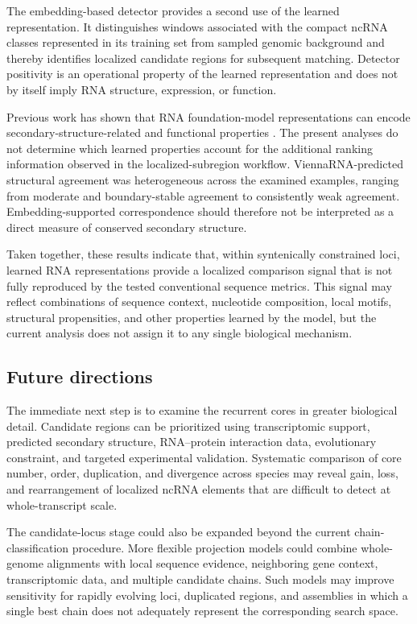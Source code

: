 The embedding-based detector provides a second use of the learned
representation. It distinguishes windows associated with the compact ncRNA
classes represented in its training set from sampled genomic background and
thereby identifies localized candidate regions for subsequent matching.
Detector positivity is an operational property of the learned representation and
does not by itself imply RNA structure, expression, or function.

Previous work has shown that RNA foundation-model representations can encode
secondary-structure-related and functional properties
\citep{chenInterpretableRNAFoundation2022,
    akiyamaInformativeRNABase2022,
    vahabAdvancingNoncodingRNA2025,
    shenAccurateRNA3D2024}.
The present analyses do not determine which learned properties account for the
additional ranking information observed in the localized-subregion workflow.
ViennaRNA-predicted structural agreement was heterogeneous across the examined
examples, ranging from moderate and boundary-stable agreement to consistently
weak agreement. Embedding-supported correspondence should therefore not be
interpreted as a direct measure of conserved secondary structure.

Taken together, these results indicate that, within syntenically constrained
loci, learned RNA representations provide a localized comparison signal that is
not fully reproduced by the tested conventional sequence metrics. This signal may
reflect combinations of sequence context, nucleotide composition, local motifs,
structural propensities, and other properties learned by the model, but the
current analysis does not assign it to any single biological mechanism.

\subsection{Future directions}

The immediate next step is to examine the recurrent cores in greater biological
detail. Candidate regions can be prioritized using transcriptomic support,
predicted secondary structure, RNA--protein interaction data, evolutionary
constraint, and targeted experimental validation. Systematic comparison of core
number, order, duplication, and divergence across species may reveal gain, loss,
and rearrangement of localized ncRNA elements that are difficult to detect at
whole-transcript scale.

The candidate-locus stage could also be expanded beyond the current
chain-classification procedure. More flexible projection models could combine
whole-genome alignments with local sequence evidence, neighboring gene context,
transcriptomic data, and multiple candidate chains. Such models may improve
sensitivity for rapidly evolving loci, duplicated regions, and assemblies in
which a single best chain does not adequately represent the corresponding search
space.

